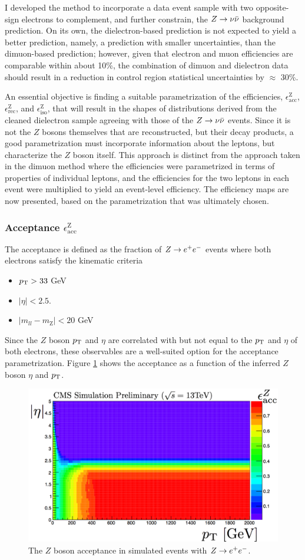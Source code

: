 I developed the method to incorporate a data event sample with two opposite-sign electrons to complement, and further constrain, the $Z\rightarrow \nu\bar{\nu}$ background prediction. On its own, the dielectron-based prediction is not expected to yield a better prediction, namely, a prediction with smaller uncertainties, than the dimuon-based prediction; however, given that electron and muon efficiencies are comparable within about 10\%, the combination of dimuon and dielectron data should result in a reduction in control region statistical uncertainties by $\approx$ 30\%. 

An essential objective is finding a suitable parametrization of the efficiencies, $\epsilon^{\text{Z}}_{\text{acc}}$, $\epsilon^{\text{Z}}_{\text{rec}}$, and $\epsilon^{\text{Z}}_{\text{iso}}$, that will result in the shapes of distributions derived from the cleaned dielectron sample agreeing with those of the $Z\rightarrow \nu\bar{\nu}$ events. Since it is not the $Z$ bosons themselves that are reconstructed, but their decay products, a good parametrization must incorporate information about the leptons, but characterize the $Z$ boson itself.  This approach is distinct from the approach taken in the dimuon method where the efficiencies were parametrized in terms of properties of individual leptons, and the efficiencies for the two leptons in each event were multiplied to yield an event-level efficiency. The efficiency maps are now presented, based on the parametrization that was ultimately chosen. 

\subsubsection{Acceptance $\epsilon^{\text{Z}}_{\text{acc}}$}
The acceptance is defined as the fraction of $Z\rightarrow e^+e^-$ events where both electrons satisfy the kinematic criteria
\begin{itemize}
\item $p_{\text{T}}>33$ GeV
\item $|\eta|<2.5$.
\item $|m_{ll}-m_{\text{Z}}|<20$ GeV
\end{itemize}
Since the $Z$ boson $p_{\text{T}}$ and $\eta$ are correlated with but not equal to the $p_{\text{T}}$ and $\eta$ of both electrons, these observables are a well-suited option for the acceptance parametrization. Figure \ref{fig:ZeeAcceptance} shows the acceptance as a function of the inferred $Z$ boson $\eta$ and $p_{\text{T}}$. 
\begin{figure}[h]
\centering
\includegraphics[width=0.7\linewidth]{figures/SusySearches/HadStop2015/ZeeAcceptance.png}
\caption{The $Z$ boson acceptance in simulated events with $Z\rightarrow e^+e^-$.}
\label{fig:ZeeAcceptance}
\end{figure}

